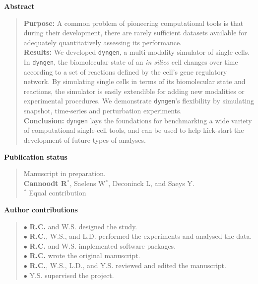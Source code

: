 \documentclass[8pt]{book}
\newif\ifrenderall
\begin{document}
{\large \textbf{Abstract}}
\begin{quote}
	\textbf{Purpose:} A common problem of pioneering computational tools is that during their development, there are rarely sufficient datasets available for adequately quantitatively assessing its performance. \\
	\textbf{Results:} We developed \texttt{dyngen}, a multi-modality simulator of single cells. 
	In \texttt{dyngen}, the biomolecular state of an \textit{in silico} cell changes over time according to a set of reactions defined by the cell's gene regulatory network. By simulating single cells in terms of its biomolecular state and reactions, the simulator is easily extendible for adding new modalities or experimental procedures. We demonstrate \texttt{dyngen}'s flexibility by simulating snapshot, time-series and perturbation experiments.\\
	\textbf{Conclusion:} \texttt{dyngen} lays the foundations for benchmarking a wide variety of computational single-cell tools, and can be used to help kick-start the development of future types of analyses.
\end{quote}

\vfill
{\large \textbf{Publication status}}
\begin{quote}
	Manuscript in preparation. \\
	\textbf{Cannoodt R}$^*$, Saelens W$^*$, Deconinck L, and Saeys Y.  \\
	{\footnotesize $^*$ Equal contribution}
\end{quote}

\vfill
{\large \textbf{Author contributions}}
\begin{quote}
	$\bullet$ \textbf{R.C.} and W.S. designed the study.\\
	$\bullet$ \textbf{R.C.}, W.S., and L.D. performed the experiments and analysed the data.\\
	$\bullet$ \textbf{R.C.} and W.S. implemented software packages.\\
	$\bullet$ \textbf{R.C.} wrote the original manuscript.\\
	$\bullet$ \textbf{R.C.}, W.S., L.D., and Y.S. reviewed and edited the manuscript. \\
	$\bullet$ Y.S. supervised the project.
\end{quote}

\vfill

\ifrenderall
\newpage
\graphicspath{{./ch2_dyngen/}}

\fi
\newpage{\thispagestyle{empty}\cleardoublepage}
\end{document}
